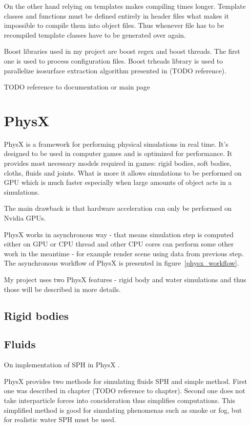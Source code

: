 On the other hand relying on templates makes compiling times longer. Template classes and functions must be defined entirely in header files what makes it impossible to compile them into object files. Thus whenever file has to be recompiled template classes have to be generated over again.

Boost libraries used in my project are boost regex and boost threads. The first one is used to process configuration files. Boost trheads library is used to parallelize isosurface extraction algorithm presented in (TODO reference).

TODO reference to documentation or main page

\section{PhysX}

PhysX is a framework for performing physical simulations in real time. It's designed to be used in computer games and is optimized for performance. It provides most necessary models required in games: rigid bodies, soft bodies, cloths, fluids and joints. What is more it allows simulations to be performed on GPU which is much faster especially when large amounts of object acts in a simulations.

The main drawback is that hardware acceleration can only be performed on Nvidia GPUs. 

PhysX works in asynchronous way - that means simulation step is computed either on GPU or CPU thread and other CPU cores can perform some other work in the meantime - for example render scene using data from previous step. The asynchronous workflow of PhysX is presented in figure~\ref{physx_workflow}.


My project uses two PhysX features - rigid body and water simulations and thus those will be described in more details. 
\subsection{Rigid bodies}


\subsection{Fluids}

On implementation of SPH in PhysX \cite{Harris08}.

PhysX provides two methods for simulating fluids SPH and simple method. First one was described in chapter (TODO reference to chapter). Second one does not take interparticle forces into concideration thus simplifies computations. This simplified method is good for simulating phenomenas such as smoke or fog, but for realistic water SPH must be used. 

